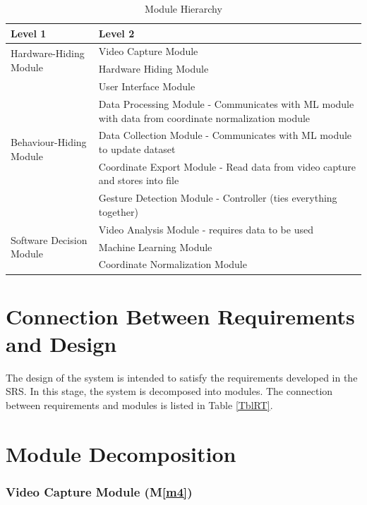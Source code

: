 \documentclass[12pt, titlepage]{article}
\newcommand{\mref}[1]{M\ref{#1}}
\begin{document}
\begin{table}[h!]
\centering
\begin{tabular}{p{} p{}}
\toprule
\textbf{Level 1} & \textbf{Level 2}\\
\midrule
\multirow{2}{0.3\textwidth}{Hardware-Hiding Module} & Video Capture Module \\
& Hardware Hiding Module\\
\midrule
\multirow{5}{0.3\textwidth}{Behaviour-Hiding Module} & User Interface Module\\
& Data Processing Module - Communicates with ML module with data from coordinate normalization module\\
& Data Collection Module - Communicates with ML module to update dataset\\
& Coordinate Export Module - Read data from video capture and stores into file\\
& Gesture Detection Module - Controller (ties everything together)\\
\midrule
\multirow{3}{0.3\textwidth}{Software Decision Module} & Video Analysis Module - requires data to be used\\
& Machine Learning Module\\
& Coordinate Normalization Module\\
\bottomrule
\end{tabular}
\caption{Module Hierarchy}
\label{TblMH}
\end{table}

\newpage

\section{Connection Between Requirements and Design} \label{SecConnection}

The design of the system is intended to satisfy the requirements developed in
the SRS. In this stage, the system is decomposed into modules. The connection
between requirements and modules is listed in Table \ref{TblRT}.

\section{Module Decomposition} \label{SecMD}

\subsubsection{Video Capture Module (\mref{m4})}
\end{document}
